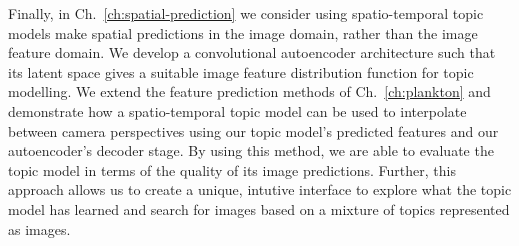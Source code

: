 Finally, in Ch.~\ref{ch:spatial-prediction} we consider using spatio-temporal topic models make spatial predictions in the image domain, rather than the image feature domain. We develop a convolutional autoencoder architecture such that its latent space gives a suitable image feature distribution function for topic modelling. We extend the feature prediction methods of Ch.~\ref{ch:plankton} and demonstrate how a spatio-temporal topic model can be used to interpolate between camera perspectives using our topic model's predicted features and our autoencoder's decoder stage. By using this method, we are able to evaluate the topic model in terms of the quality of its image predictions. Further, this approach allows us to create a unique, intutive interface to explore what the topic model has learned and search for images based on a mixture of topics represented as images.
